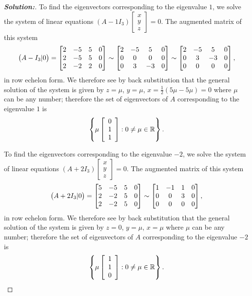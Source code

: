 \documentclass[a4paper]{amsart}
\theoremstyle{definition}
\newenvironment{solution}{\begin{proof}[\textbf{Solution:}] \vphantom{u}}{\end{proof}}
\begin{document}
\begin{solution}
 To find the eigenvectors corresponding to the eigenvalue $1$, we
 solve the system of linear equations $(A - 1I_3)\left[
 \begin{array}{c}x \\ y\\z
 \end{array} \right] = 0$. The augmented matrix of this system
 $$
 \big(A - I_3|0\big) = \left[\begin{matrix} 2 & -5 & 5 &0\\
     2 & -5 & 5 &0\\
     2 & -2 & 2&0\end{matrix}\right] \sim
 \left[\begin{matrix} 2 & -5 & 5 &0\\
     0 & 0 & 0 &0\\
     0 & 3 & -3&0\end{matrix}\right] \sim
 \left[\begin{matrix} 2 & -5 & 5 &0\\
     0 & 3 & -3 &0\\
     0 & 0 & 0&0\end{matrix}\right],
 $$
 in row echelon form. We therefore see by back substitution that
 the general solution of the system is given by $z = \mu$, $y =
 \mu$, $x = \frac{1}{2}(5\mu - 5\mu) = 0$ where $\mu$ can be any
 number; therefore the set of eigenvectors of $A$ corresponding to
 the eigenvalue $1$ is
 $$
 \left\{ \mu \left[ \begin{array}{c} 0\\1\\1
 \end{array} \right] : 0 \neq \mu \in {\mathbb{R}} \right\}.
 $$

 To find the eigenvectors corresponding to the eigenvalue $-2$, we
 solve the system of linear equations $(A + 2I_3)\left[
 \begin{array}{c}x \\ y\\z
 \end{array} \right] = 0$. The augmented matrix of this system
 $$
 \big(A +2 I_3|0\big) = \left[\begin{matrix} 5 & -5 & 5 &0\\
     2 & -2 & 5 &0\\
     2 & -2 & 5&0\end{matrix}\right] \sim
 \left[\begin{matrix} 1 & -1 & 1 &0\\
     0 & 0 & 3 &0\\
     0 & 0 & 0&0\end{matrix}\right],
 $$
 in row echelon form. We therefore see by back substitution that
 the general solution of the system is given by $z = 0$, $y = \mu$,
 $x = \mu$ where $\mu$ can be any number; therefore the set of
 eigenvectors of $A$ corresponding to the eigenvalue $-2$ is
 $$
 \left\{ \mu \left[ \begin{array}{c} 1\\1\\0
 \end{array} \right] : 0 \neq \mu \in {\mathbb{R}} \right\}.
 $$


\end{solution}
\end{document}
